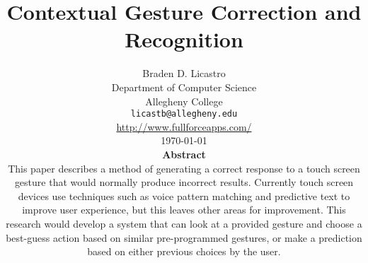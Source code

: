 \documentclass[11pt]{article}
\def\widow#1{\vskip #1\vbadness10000\penalty-200\vskip-#1}
\begin{document}



\def\widow#1{\vskip #1\vbadness10000\penalty-200\vskip-#1}


\makeatletter

\def\maketitle{%
  \thispagestyle{empty}%
  \begin{center}%
    {\Huge \@title\par}%
    {\normalsize \@author\par}%
    \vskip .4in
  \end{center}%

  }

\makeatother

\vspace*{-1.1in}
\title{Contextual Gesture Correction and Recognition}

\author{Braden D. Licastro\\
Department of Computer Science\\
Allegheny College \\
{\tt licastb@allegheny.edu}  \\
\url{http://www.fullforceapps.com/} \\ 
\vspace*{.1in} \today \\ \vspace*{.1in}
{\bf Abstract} \\ This paper describes a method of generating a correct response to a touch screen gesture that would normally produce incorrect results. Currently touch screen devices use techniques such as voice pattern matching and predictive text to improve user experience, but this leaves other areas for improvement. This research would develop a system that can look at a provided gesture and choose a best-guess action based on similar pre-programmed gestures, or make a prediction based on either previous choices by the user.}
\end{document}
